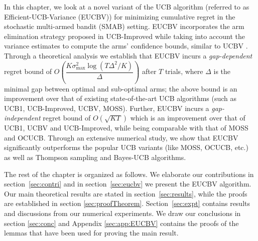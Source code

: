In this chapter, we look at a novel variant of the UCB algorithm (referred to as Efficient-UCB-Variance (EUCBV)) for minimizing cumulative regret in the stochastic multi-armed bandit (SMAB) setting. EUCBV incorporates the arm elimination strategy proposed in UCB-Improved \citep{auer2010ucb} while taking into account the variance estimates to compute the arms' confidence bounds, similar to UCBV \citep{audibert2009exploration}. Through a theoretical analysis we establish that EUCBV incurs a \emph{gap-dependent} regret bound of {$O\left( \dfrac{K\sigma^2_{\max} \log (T\Delta^2 /K)}{\Delta}\right)$} after $T$ trials, where $\Delta$ is the minimal gap between optimal and sub-optimal arms; the above bound is an improvement over that of existing state-of-the-art UCB algorithms (such as UCB1, UCB-Improved, UCBV,  MOSS). Further, EUCBV incurs a \emph{gap-independent} regret bound of {$O\left(\sqrt{KT}\right)$}  which is an improvement over that of UCB1, UCBV and UCB-Improved, while being comparable with that of MOSS and OCUCB. Through an extensive numerical study, we show that EUCBV significantly outperforms the popular UCB variants (like MOSS, OCUCB, etc.) as well as Thompson sampling and Bayes-UCB algorithms. 

    The rest of the chapter is organized as follows. We elaborate our contributions in section~\ref{sec:contri} and in section~\ref{sec:eucbv} we present the  EUCBV algorithm. Our main theoretical results are stated in section~\ref{sec:results}, while the proofs are established in section \ref{sec:proofTheorem}. Section~\ref{sec:expt} contains results and discussions from our numerical experiments. We draw our conclusions in section \ref{sec:conc} and Appendix \ref{sec:app:EUCBV} contains the proofs of the lemmas that have been used for proving the main result.
    
